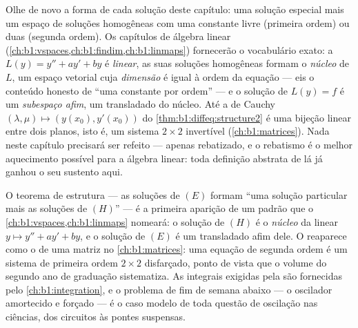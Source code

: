 \begin{remark}\label{rem:b1:diffeq:interlude}
Olhe de novo a forma de cada  solução deste capítulo: uma
solução especial mais um espaço de soluções homogêneas com uma
constante livre (primeira ordem) ou duas (segunda ordem). Os capítulos
de álgebra linear (\cref{ch:b1:vspaces,ch:b1:findim,ch:b1:linmaps})
fornecerão o vocabulário exato: a  $L(y) = y'' + ay' + by$ é
\emph{linear}, as suas soluções homogêneas formam o \emph{núcleo} de
$L$, um espaço vetorial cuja \emph{dimensão} é igual à ordem da equação
--- eis o conteúdo honesto de ``uma constante por ordem'' --- e
o  solução de $L(y) = f$ é um \emph{subespaço afim}, um
transladado do núcleo. Até a  de Cauchy $(\lambda, \mu)
\mapsto (y(x_0), y'(x_0))$ do \cref{thm:b1:diffeq:structure2} é uma
bijeção linear entre dois planos, isto é, um sistema $2
\times 2$
invertível (\cref{ch:b1:matrices}). Nada neste capítulo
precisará ser refeito --- apenas rebatizado, e o rebatismo é o melhor
aquecimento possível para a álgebra linear:
toda definição abstrata de lá já ganhou o seu sustento aqui.
\end{remark}

\begin{remark}\label{rem:b1:diffeq:whereused}
O teorema de estrutura --- as soluções de $(E)$ formam ``uma solução
particular mais as soluções de $(H)$'' --- é a primeira aparição
de um padrão que o \cref{ch:b1:vspaces,ch:b1:linmaps} nomeará: o
 solução de $(H)$ é o \emph{núcleo} da  linear $y
\mapsto y'' + ay' + by$, e o  solução de $(E)$ é um
transladado afim dele. O  reaparece como
o  de uma matriz no \cref{ch:b1:matrices}:
uma equação de segunda ordem é um sistema de primeira ordem $2 \times 2$ disfarçado, ponto de vista que o volume do segundo ano de graduação
sistematiza. As integrais exigidas pela  são
fornecidas pelo \cref{ch:b1:integration}, e o problema de fim de semana abaixo ---
o oscilador amortecido e forçado --- é o caso modelo de toda
questão de oscilação nas ciências, dos circuitos às pontes
suspensas.
\end{remark}

